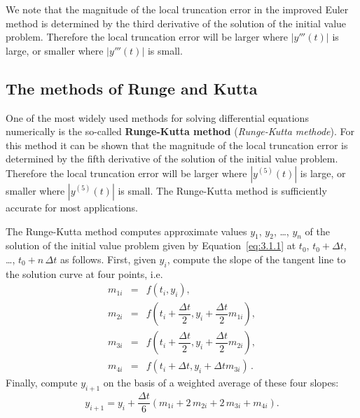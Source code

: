 We note that the magnitude of the local truncation error in the improved Euler method  is determined by the third derivative of the solution of the initial value problem. Therefore the local truncation error will be larger where $|y'''(t)|$ is large, or smaller where $|y'''(t)|$ is small.

\subsection{The methods of Runge and Kutta}\label{secRK}
One of the most widely used methods for solving differential equations numerically is the so-called \textbf{Runge-Kutta method} (\textit{Runge-Kutta methode}). For this method it can be shown that the magnitude of the local truncation error is determined by the fifth derivative of the solution of the initial value problem. Therefore the local truncation error will be larger where $|y^{(5)}(t)|$ is large, or smaller where $|y^{(5)}(t)|$ is small. The Runge-Kutta method is sufficiently accurate for most applications.

The Runge-Kutta method computes approximate values $y_1$, $y_2$, \dots, $y_n$ of the solution of the initial value problem given by Equation~\eqref{eq:3.1.1} at $t_0$, $t_0+\Delta t$, \dots, $t_0+n\,\Delta t$ as follows. First, given $y_i$, compute the slope of the tangent line to the solution curve at four points, i.e.
\begin{eqnarray*} 
m_{1i}&=&f(t_i,y_i),\\
m_{2i}&=&f\left(t_i+\dfrac{\Delta t}{2},y_i+\dfrac{\Delta t}{2}m_{1i}\right),\\
m_{3i}&=&f\left(t_i+\dfrac{\Delta t}{2},y_i+\dfrac{\Delta t}{2}m_{2i}\right),\\
m_{4i}&=&f(t_i+\Delta t,y_i+\Delta t m_{3i})\,.
\end{eqnarray*}
Finally, compute $y_{i+1}$ on the basis of a weighted average of these four slopes: 
\begin{equation} \label{eq:3.4.4}
y_{i+1}=y_i+\dfrac{\Delta t}{6}\left(m_{1i}+2\,m_{2i}+2\,m_{3i}+m_{4i}\right).
\end{equation}


